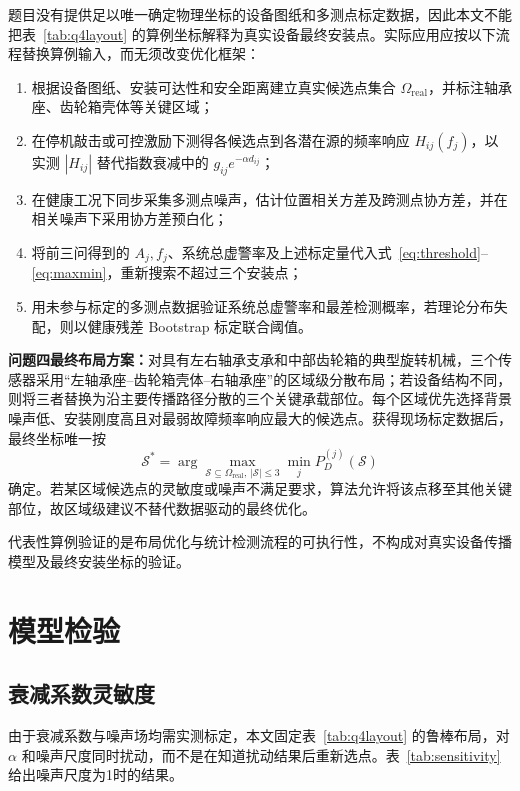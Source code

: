 \documentclass[withoutpreface,bwprint]{cumcmthesis}
\begin{document}
题目没有提供足以唯一确定物理坐标的设备图纸和多测点标定数据，因此本文不能把表~\ref{tab:q4layout} 的算例坐标解释为真实设备最终安装点。实际应用应按以下流程替换算例输入，而无须改变优化框架：
\begin{enumerate}[label=（\arabic*）,leftmargin=3em,itemsep=0pt,topsep=2pt,parsep=0pt]
    \item 根据设备图纸、安装可达性和安全距离建立真实候选点集合 \(\Omega_{\mathrm{real}}\)，并标注轴承座、齿轮箱壳体等关键区域；
    \item 在停机敲击或可控激励下测得各候选点到各潜在源的频率响应 \(H_{ij}(f_j)\)，以实测 \(|H_{ij}|\) 替代指数衰减中的 \(g_{ij}e^{-\alpha d_{ij}}\)；
    \item 在健康工况下同步采集多测点噪声，估计位置相关方差及跨测点协方差，并在相关噪声下采用协方差预白化；
    \item 将前三问得到的 \(A_j,f_j\)、系统总虚警率及上述标定量代入式~\eqref{eq:threshold}--\eqref{eq:maxmin}，重新搜索不超过三个安装点；
    \item 用未参与标定的多测点数据验证系统总虚警率和最差检测概率，若理论分布失配，则以健康残差 Bootstrap 标定联合阈值。
\end{enumerate}
\textbf{问题四最终布局方案：}对具有左右轴承支承和中部齿轮箱的典型旋转机械，三个传感器采用“左轴承座--齿轮箱壳体--右轴承座”的区域级分散布局；若设备结构不同，则将三者替换为沿主要传播路径分散的三个关键承载部位。每个区域优先选择背景噪声低、安装刚度高且对最弱故障频率响应最大的候选点。获得现场标定数据后，最终坐标唯一按
\[
 \mathcal S^*=\arg\max_{\mathcal S\subseteq\Omega_{\mathrm{real}},\,|\mathcal S|\le3}
 \min_j P_D^{(j)}(\mathcal S)
\]
确定。若某区域候选点的灵敏度或噪声不满足要求，算法允许将该点移至其他关键部位，故区域级建议不替代数据驱动的最终优化。

代表性算例验证的是布局优化与统计检测流程的可执行性，不构成对真实设备传播模型及最终安装坐标的验证。

\section{模型检验}

\subsection{衰减系数灵敏度}

由于衰减系数与噪声场均需实测标定，本文固定表~\ref{tab:q4layout} 的鲁棒布局，对 \(\alpha\) 和噪声尺度同时扰动，而不是在知道扰动结果后重新选点。表~\ref{tab:sensitivity} 给出噪声尺度为1时的结果。
\end{document}
